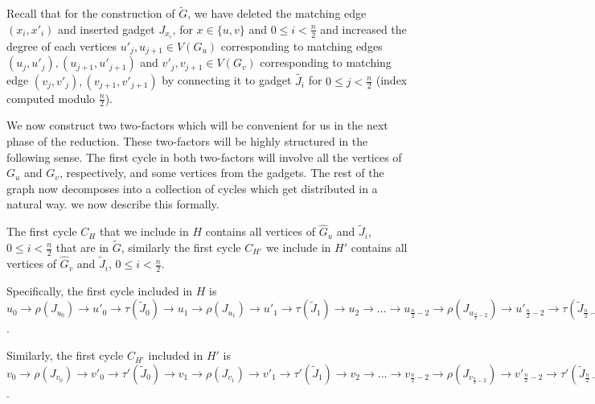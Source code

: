 \documentclass[svgnames]{llncs}
\begin{document}
{Recall that for the construction of $\tilde{G}$, we have deleted the matching edge $(x_i,x'_i)$ and inserted gadget $J_{x_i}$, for $x \in \{u,v\}$ and $0 \leq i <\frac{n}{2}$ and increased the degree of each vertices
$u'_j,u_{j+1} \in V(G_u)$ corresponding to matching edges $(u_j,u'_j),(u_{j+1},u'_{j+1})$ and $v'_j,v_{j+1} \in V(G_v)$
corresponding to matching edge $(v_j,v'_j),(v_{j+1},v'_{j+1})$ by connecting it to gadget $\tilde{J_i}$ for $0 \leq j < \frac{n}{2}$ (index computed modulo $\frac{n}{2}$). 

We now construct two two-factors which will be convenient for us in the next phase of the reduction. These two-factors will be highly structured in the following sense. The first cycle in both two-factors will involve all the vertices of $G_u$ and $G_v$, respectively, and some vertices from the gadgets. The rest of the graph now decomposes into a collection of cycles which get distributed in a natural way. we now describe this formally. 

The first cycle $C_H$ that we include in $H$ contains all vertices of $\hat{G}_u$ and $\tilde{J}_i$, $0 \leq i < \frac{n}{2}$ that are in $\tilde{G}$,
similarly the first cycle $C_{H'}$ we include in $H'$ contains all vertices of $\hat{G}_v$ and $\tilde{J}_i$, $0 \leq i < \frac{n}{2}$.

Specifically, the first cycle included in $H$ is $u_0 \rightarrow \rho(J_{u_0}) \rightarrow u'_0 \rightarrow \tau(\tilde{J}_0) \rightarrow
u_1 \rightarrow \rho(J_{u_1}) \rightarrow u'_1 \rightarrow \tau(\tilde{J}_1) \rightarrow u_2 \rightarrow ... \rightarrow
u_{\frac{n}{2}-2} \rightarrow \rho(J_{u_{\frac{n}{2}-2}}) \rightarrow u'_{\frac{n}{2}-2} \rightarrow \tau(\tilde{J}_{\frac{n}{2}-2}) \rightarrow
u_{\frac{n}{2}-1} \rightarrow \rho(J_{u_{\frac{n}{2}-1}}) \rightarrow u'_{\frac{n}{2}-1} \rightarrow \tau(\tilde{J}_{\frac{n}{2}-1}) \rightarrow u_0$.

Similarly, the first cycle $C_{H'}$ included in $H'$ is $v_0 \rightarrow \rho(J_{v_0}) \rightarrow v'_0 \rightarrow \tau'(\tilde{J}_0) \rightarrow
v_1 \rightarrow \rho(J_{v_1}) \rightarrow v'_1 \rightarrow \tau'(\tilde{J}_1) \rightarrow v_2 \rightarrow ... \rightarrow
v_{\frac{n}{2}-2} \rightarrow \rho(J_{v_{\frac{n}{2}-2}}) \rightarrow v'_{\frac{n}{2}-2} \rightarrow \tau'(\tilde{J}_{\frac{n}{2}-2}) \rightarrow
v_{\frac{n}{2}-1} \rightarrow \rho(J_{v_{\frac{n}{2}-1}}) \rightarrow v'_{\frac{n}{2}-1} \rightarrow \tau'(\tilde{J}_{\frac{n}{2}-1}) \rightarrow v_0$.


}
\end{document}
